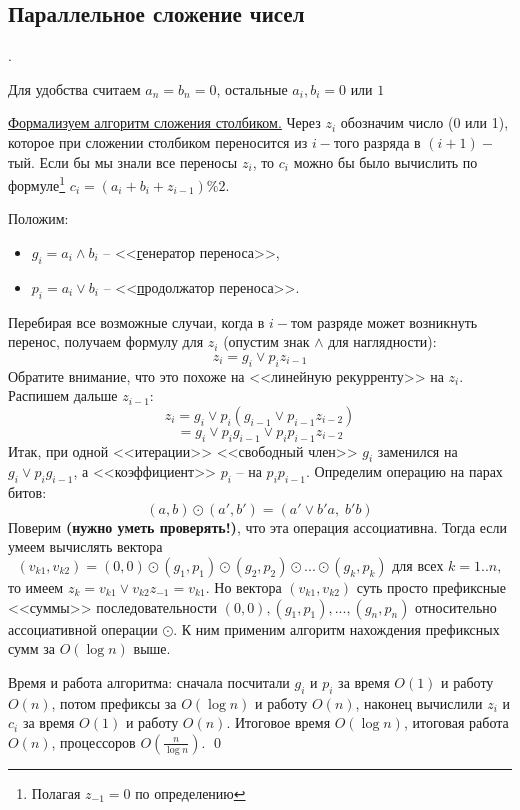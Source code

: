 \subsection{Параллельное сложение чисел}
.

 Для удобства считаем $a_n = b_n = 0$, остальные $a_i, b_i = 0\text{ или }1$

\underline{Формализуем алгоритм сложения столбиком.} Через $z_i$ обозначим число (0 или 1), которое при сложении столбиком переносится из $i-$того разряда в $(i+1)-$тый. Если бы мы знали все переносы $z_i$, то $c_i$ можно бы было вычислить по формуле\footnote{Полагая $z_{-1}=0$ по определению} $c_i = (a_i+b_i+z_{i-1})\%2$.

Положим:
\begin{itemize}
\item $g_i = a_i \land b_i$ -- <<\underline{г}енератор переноса>>,
\item $p_i = a_i \lor b_i$ -- <<\underline{п}родолжатор переноса>>.
\end{itemize}
Перебирая все возможные случаи, когда в $i-$том разряде может возникнуть перенос, получаем формулу для $z_i$ (опустим знак $\land$ для наглядности): 
$$z_i = g_i \lor p_i z_{i-1}$$
Обратите внимание, что это похоже на <<линейную рекурренту>> на $z_i$. Распишем дальше $z_{i-1}$:
$$z_i = g_i \lor p_i(g_{i-1} \lor p_{i-1} z_{i-2})$$ $$ =g_i \lor p_i g_{i-1} \lor p_i p_{i-1} z_{i-2}$$
Итак, при одной <<итерации>> <<свободный член>> $g_i$ заменился на $g_i \lor p_i g_{i-1}$, а <<коэффициент>> $p_i$ -- на $p_i p_{i-1}$.
Определим операцию на парах битов: $$(a,b) \odot (a', b') = (a' \lor b' a, \;b' b)$$
Поверим \textbf{(нужно уметь проверять!)}, что эта операция ассоциативна. 
Тогда если умеем вычислять вектора $$(v_{k1}, v_{k2}) = (0, 0)\odot (g_1, p_1)\odot (g_2, p_2)\odot ... \odot (g_k, p_k) \text{ для всех } k=1..n,$$ то имеем $z_k = v_{k1} \lor v_{k2}z_{-1} = v_{k1}$. Но вектора $(v_{k1}, v_{k2})$ суть просто префиксные <<суммы>> последовательности $(0, 0), (g_1, p_1), ..., (g_n, p_n)$ относительно ассоциативной операции $\odot$. К ним применим алгоритм нахождения префиксных сумм за $O(\log n)$ выше.

Время и работа алгоритма: сначала посчитали $g_i$ и $p_i$ за время $O(1)$ и работу $O(n)$, потом префиксы за $O(\log n)$ и работу $O(n)$, наконец вычислили $z_i$ и $c_i$ за время $O(1)$  и работу $O(n)$. Итоговое время $O(\log n)$, итоговая работа $O(n)$, процессоров $O(\frac{n}{\log n})$. \qed
 
